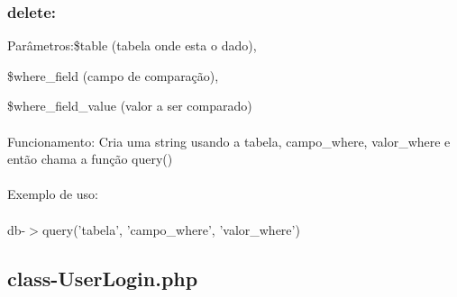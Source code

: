 \documentclass{article}
\begin{document}
		\subsubsection{delete:}
			Parâmetros:\$table (tabela onde esta o dado),
			
			\qquad\qquad\$where\_field (campo de comparação),
			
			\qquad\qquad\$where\_field\_value (valor a ser comparado)\\\\
			Funcionamento: Cria uma string usando a tabela, campo\_where, valor\_where e então chama a função query()\\\\
			Exemplo de uso:\\\\
			db-$>$query('tabela', 'campo\_where', 'valor\_where')
			
	\subsection{class-UserLogin.php}
\end{document}
